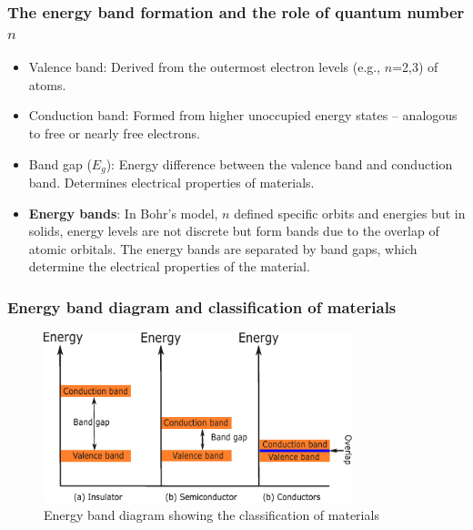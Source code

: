 \begin{frame}
	\frametitle{The energy band formation and the role of quantum number $n$}
    \begin{itemize}
        \item Valence band: Derived from the outermost electron levels (e.g., $n$=2,3) of atoms.
        \item Conduction band: Formed from higher unoccupied energy states -- analogous to free or nearly free electrons.
        \item Band gap ($E_g$): Energy difference between the valence band and conduction band. Determines electrical properties of materials.
        \item \textbf{Energy bands}: In Bohr's model, $n$ defined specific orbits and energies but in solids, energy levels are not discrete but form bands due to the overlap of atomic orbitals. The energy bands are separated by band gaps, which determine the electrical properties of the material.
    \end{itemize}
\end{frame}

\begin{frame}
	\frametitle{Energy band diagram and classification of materials}
            \begin{figure}
                \centering
                \includegraphics[width=0.8\textwidth]{fig/lec02/band_diagram.pdf}
                \caption{Energy band diagram showing the classification of materials}
            \end{figure}
\end{frame}

